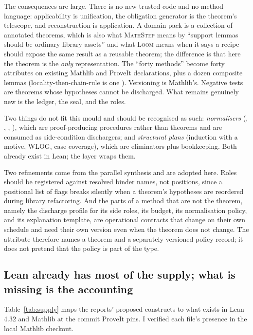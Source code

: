 \documentclass[11pt,a4paper]{article}
\newcommand{\code}[1]{\texttt{\detokenize{#1}}}
\newcommand{\MS}{\textsc{MathStep}}
\newcommand{\Lo}{\textsc{Loom}}
\theoremstyle{definition}
\begin{document}
The consequences are large. There is no new trusted code and no method language: applicability is unification, the obligation generator is the theorem's telescope, and reconstruction is application. A domain pack is a collection of annotated theorems, which is also what \MS{} means by ``support lemmas should be ordinary library assets'' and what \Lo{} means when it says a recipe should expose the same result as a reusable theorem; the difference is that here the theorem is the \emph{only} representation. The ``forty methods'' become forty attributes on existing Mathlib and ProveIt declarations, plus a dozen composite lemmas (locality-then-chain-rule is one \code{theorem}). Versioning is Mathlib's. Negative tests are theorems whose hypotheses cannot be discharged. What remains genuinely new is the ledger, the seal, and the roles.

Two things do not fit this mould and should be recognised as such: \emph{normalisers} (\code{ring}, \code{field_simp}, \code{push_cast}, \code{omega}), which are proof-producing procedures rather than theorems and are consumed as side-condition dischargers; and \emph{structural plans} (induction with a motive, WLOG, case coverage), which are eliminators plus bookkeeping. Both already exist in Lean; the layer wraps them.

Two refinements come from the parallel synthesis and are adopted here. Roles should be registered against resolved binder names, not positions, since a positional list of flags breaks silently when a theorem's hypotheses are reordered during library refactoring. And the parts of a method that are not the theorem, namely the discharge profile for its side roles, its budget, its normalisation policy, and its explanation template, are operational contracts that change on their own schedule and need their own version even when the theorem does not change. The attribute therefore names a theorem and a separately versioned policy record; it does not pretend that the policy is part of the type.

\subsection{Lean already has most of the supply; what is missing is the accounting}
\label{sec:supply}
Table~\ref{tab:supply} maps the reports' proposed constructs to what exists in Lean 4.32 and Mathlib at the commit ProveIt pins. I verified each file's presence in the local Mathlib checkout.
\end{document}
